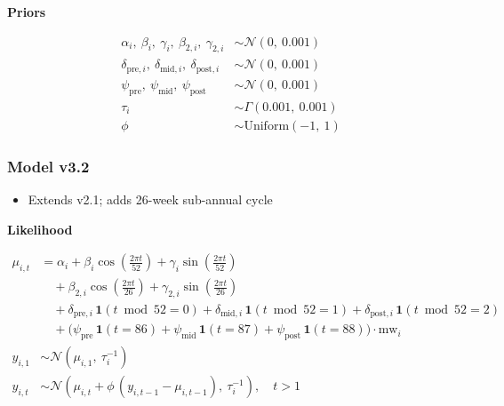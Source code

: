 \documentclass[
]{article}
\providecommand{\tightlist}{%
  \setlength{\itemsep}{0pt}\setlength{\parskip}{0pt}}
\begin{document}
\textbf{Priors}

\[
\begin{aligned}
\alpha_i,\ \beta_i,\ \gamma_i,\ \beta_{2,i},\ \gamma_{2,i} &\sim \mathcal{N}(0,\ 0.001) \\[4pt]
\delta_{\text{pre},i},\ \delta_{\text{mid},i},\ \delta_{\text{post},i} &\sim \mathcal{N}(0,\ 0.001) \\[4pt]
\psi_{\text{pre}},\ \psi_{\text{mid}},\ \psi_{\text{post}} &\sim \mathcal{N}(0,\ 0.001) \\[4pt]
\tau_i &\sim \Gamma(0.001,\ 0.001) \\[4pt]
\phi   &\sim \mathrm{Uniform}(-1,\ 1)
\end{aligned}
\]

\subsubsection*{Model v3.2}\label{model-v3.2}

\begin{itemize}
\tightlist
\item
  Extends v2.1; adds 26-week sub-annual cycle
\end{itemize}

\textbf{Likelihood}

\[
\begin{aligned}
\mu_{i,t} &= \alpha_i
              + \beta_i \cos\!\left(\tfrac{2\pi t}{52}\right)
              + \gamma_i \sin\!\left(\tfrac{2\pi t}{52}\right) \\[4pt]
           &\quad + \beta_{2,i} \cos\!\left(\tfrac{2\pi t}{26}\right)
                  + \gamma_{2,i} \sin\!\left(\tfrac{2\pi t}{26}\right) \\[4pt]
           &\quad + \delta_{\text{pre},i}\,\mathbf{1}(t \bmod 52 = 0)
              + \delta_{\text{mid},i}\,\mathbf{1}(t \bmod 52 = 1)
              + \delta_{\text{post},i}\,\mathbf{1}(t \bmod 52 = 2) \\[4pt]
           &\quad + \bigl(\psi_{\text{pre}}\,\mathbf{1}(t = 86)
              + \psi_{\text{mid}}\,\mathbf{1}(t = 87)
              + \psi_{\text{post}}\,\mathbf{1}(t = 88)\bigr)\cdot\mathrm{mw}_i \\[4pt]
y_{i,1} &\sim \mathcal{N}(\mu_{i,1},\ \tau_i^{-1}) \\[4pt]
y_{i,t} &\sim \mathcal{N}\!\left(\mu_{i,t} + \phi\,(y_{i,t-1} - \mu_{i,t-1}),\ \tau_i^{-1}\right), \quad t > 1
\end{aligned}
\]
\end{document}
